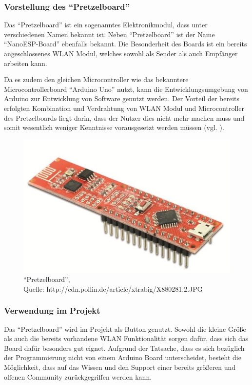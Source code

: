 \subsubsection{Vorstellung des ``Pretzelboard''}        
\label{sec:Vorstellung des ``Pretzelboard''} 
Das ``Pretzelboard'' ist ein sogenanntes Elektronikmodul, dass unter verschiedenen Namen bekannt ist. Neben ``Pretzelboard'' ist der Name ``NanoESP-Board'' ebenfalls bekannt. Die Besonderheit des Boards ist ein bereits angeschlossenes \ac{WLAN} Modul, welches sowohl als Sender als auch Empfänger arbeiten kann. 

Da es zudem den gleichen Microcontroller wie das bekanntere Microcontrollerboard ``Arduino Uno'' nutzt, kann die Entwicklungsumgebung von Arduino zur Entwicklung von Software genutzt werden. 
Der Vorteil der bereits erfolgten Kombination und Verdrahtung von \ac{WLAN} Modul und Microcontroller des Pretzelboards liegt darin, dass der Nutzer dies nicht mehr machen muss und somit wesentlich weniger Kenntnisse vorausgesetzt werden müssen (vgl. \cite{.b}\cite{.kafka}\cite{FranzisVerlagGmbH.27.11.2015}).

\begin{figure}[!htb]
	\centering
	\includegraphics[scale=0.4]{Pretzel.jpg}
	\caption[``Pretzelboard'']{``Pretzelboard'',\\ Quelle: http://cdn.pollin.de/article/xtrabig/X880281.2.JPG}
\end{figure}

\subsubsection{Verwendung im Projekt}        
\label{sec:Verwendung des ``Pretzelboard''} 
Das ``Pretzelboard'' wird im Projekt als Button genutzt. Sowohl die kleine Größe als auch die bereits vorhandene \ac{WLAN} Funktionalität sorgen dafür, dass sich das Board dafür besonders gut eignet. Aufgrund der Tatsache, dass es sich bezüglich der Programmierung nicht von einem Arduino Board unterscheidet, besteht die Möglichkeit, dass auf das Wissen und den Support einer bereits größeren und offenen Community zurückgegriffen werden kann. 

